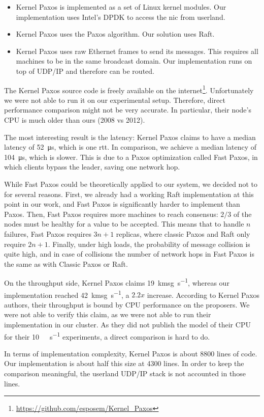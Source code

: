 \begin{itemize}
    \item Kernel Paxos is implemented as a set of Linux kernel modules.
        Our implementation uses Intel's DPDK\cite{dpdk} to access the \gls{nic} from userland.
    \item Kernel Paxos uses the Paxos algorithm.
        Our solution uses Raft.
    \item Kernel Paxos uses raw Ethernet frames to send its messages.
        This requires all machines to be in the same broadcast domain.
        Our implementation runs on top of UDP/IP and therefore can be routed.
\end{itemize}

The Kernel Paxos source code is freely available on the internet\footnote{\url{https://github.com/esposem/Kernel_Paxos}}.
Unfortunately we were not able to run it on our experimental setup.
Therefore, direct performance comparison might not be very accurate.
In particular, their node's CPU is much older than ours (2008 vs 2012).

The most interesting result is the latency: Kernel Paxos claims to have a median latency of \SI{52}{\micro\second}, which is one \gls{rtt}.
In comparison, we achieve a median latency of \SI{104}{\micro\second}, which is slower.  %
This is due to a Paxos optimization called Fast Paxos\cite{lamport2006fast}, in which clients bypass the leader, saving one network hop.

While Fast Paxos could be theoretically applied to our system, we decided not to for several reasons.
First, we already had a working Raft implementation at this point in our work, and Fast Paxos is significantly harder to implement than Paxos.
Then, Fast Paxos requires more machines to reach consensus: $2/3$ of the nodes must be healthy for a value to be accepted.
This means that to handle $n$ failures, Fast Paxos requires $3n + 1$ replicas, where classic Paxos and Raft only require $2n + 1$.
Finally, under high loads, the probability of message collision is quite high, and in case of collisions the number of network hops in Fast Paxos is the same as with Classic Paxos or Raft.

On the throughput side, Kernel Paxos claims \SI{19}{\kilo msg\per\second}, whereas our implementation reached \SI{42}{\kilo msg\per\second}, a $2.2x$ increase. %
According to Kernel Paxos authors, their throughput is bound by CPU performance on the proposers.
We were not able to verify this claim, as we were not able to run their implementation in our cluster.
As they did not publish the model of their CPU for their \SI{10}{\giga\bit\per\second} experiments, a direct comparison is hard to do.

In terms of implementation complexity, Kernel Paxos is about 8800 lines of code.
Our implementation is about half this size at 4300 lines.
In order to keep the comparison meaningful, the userland UDP/IP stack is not accounted in those lines.
